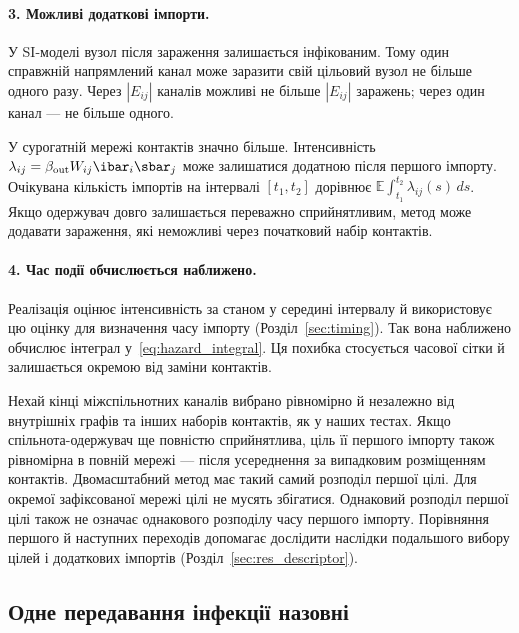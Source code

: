\paragraph{3. Можливі додаткові імпорти.}
У SI-моделі вузол після зараження залишається інфікованим. Тому один справжній напрямлений канал може заразити свій цільовий вузол не більше одного разу. Через $|E_{ij}|$ каналів можливі не більше $|E_{ij}|$ заражень; через один канал --- не більше одного.
\par У сурогатній мережі контактів значно більше. Інтенсивність $\lambda_{ij}=\beta_{\mathrm{out}}W_{ij}\ibar_i\sbar_j$ може залишатися додатною після першого імпорту. Очікувана кількість імпортів на інтервалі $[t_1,t_2]$ дорівнює $\mathbb{E}\int_{t_1}^{t_2}\lambda_{ij}(s)\,ds$. Якщо одержувач довго залишається переважно сприйнятливим, метод може додавати зараження, які неможливі через початковий набір контактів.

\paragraph{4. Час події обчислюється наближено.}
Реалізація оцінює інтенсивність за станом у середині інтервалу й використовує цю оцінку для визначення часу імпорту (Розділ~\ref{sec:timing}). Так вона наближено обчислює інтеграл у~\eqref{eq:hazard_integral}. Ця похибка стосується часової сітки й залишається окремою від заміни контактів.

\begin{remark}
\label{rem:placement}
Нехай кінці міжспільнотних каналів вибрано рівномірно й незалежно від внутрішніх графів та інших наборів контактів, як у наших тестах. Якщо спільнота-одержувач ще повністю сприйнятлива, ціль її першого імпорту також рівномірна в повній мережі --- після усереднення за випадковим розміщенням контактів. Двомасштабний метод має такий самий розподіл першої цілі. Для окремої зафіксованої мережі цілі не мусять збігатися. Однаковий розподіл першої цілі також не означає однакового розподілу часу першого імпорту. Порівняння першого й наступних переходів допомагає дослідити наслідки подальшого вибору цілей і додаткових імпортів (Розділ~\ref{sec:res_descriptor}).
\end{remark}

\subsection{Одне передавання інфекції назовні}
\label{sec:single_export}

